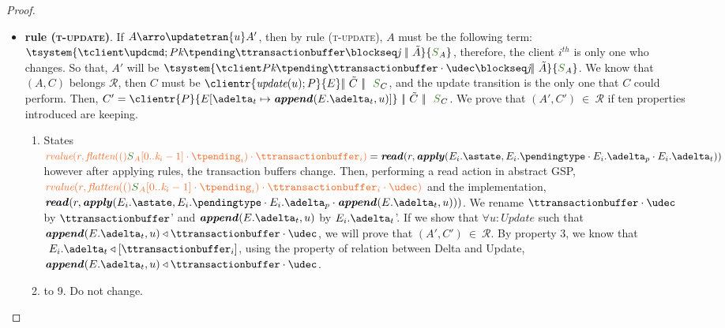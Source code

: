 \documentclass[envcountsect,runningheads,orivec]{llncs}
\begin{document}
\begin{proof}
\begin{itemize}
\begin{itemize}
			\item {\bf rule (\textsc{t-update})}. If $A \arroi{\updatetran{u}} A'$, then by rule (\textsc{\footnotesize{t-update}}), $A$ must be the following term: $ \tsystem{\tclienti{\tupdateins}{\tknown}{\tpending}{\ttransactionbuffer}{\tsent}{\treceivebuffer}\ \bigpar\ \tilde{A}}{\queuemessage_A}$, therefore, the client $i^{th}$ is only one who changes. So that, $A'$ will be $\tsystem{\tclienti{\tprogram}{\tknown}{\tpending}{\ttransactionbuffer \cdot \tupdate}{\tsent}{\treceivebuffer}\bigpar\ \tilde{A}}{\queuemessage_A}$. We know that $(A,C)$ belongs $\mathcal{R}$, then $C$ must be $\clientr{\updateins{u}}{\stateclient} \bigpar\ \tilde{C} \ \bigpar\ \ \queuemessage_C$, and the update transition is the only one that $C$ could perform. Then, $C' = \clientr{P}{\update{E}{\transactionbuffer}{\appendplus{E.\transactionbuffer}{u}}}\ \bigpar\ \tilde{C} \ \bigpar\ \ \queuemessage_C$. We prove that $(A',C') \ \in \ \mathcal{R}$ if ten properties introduced are keeping.					
						\begin{enumerate}
							\item States $\rvalue{r}{\flatten(\queuemessage_{A}[0..\tknown_i-1] \cdot \tpending_i) \cdot \ttransactionbuffer_i} = \readp{r}{\applyplus{E_{i}.\known}{E_{i}.\pending \cdot E_{i}.\pushbuffer \cdot E_{i}.\transactionbuffer}}$ however after applying rules, the transaction buffers change. Then, performing a read action in abstract GSP, $\rvalue{r}{\flatten(\queuemessage_{A}[0..\tknown_i-1] \cdot \tpending_i) \cdot \ttransactionbuffer_i \cdot \tupdate}$ and the implementation, $\readp{r}{\applyplus{E_{i}.\known}{E_{i}.\pending \cdot E_{i}.\pushbuffer \cdot \appendplus{E.\transactionbuffer}{u}}}$. We rename $\ttransactionbuffer \cdot \tupdate$ by $\ttransactionbuffer$' and  $\appendplus{E.\transactionbuffer}{u}$ by $E_{i}.\transactionbuffer$'. If we show that $\forall u: Update$ such that $\appendplus{E.\transactionbuffer}{u} \triangleleft \ttransactionbuffer \cdot \tupdate$, we will prove that $(A',C') \ \in \ \mathcal{R}$. By property 3, we know that $\ E_{i}.\transactionbuffer \triangleleft [\ttransactionbuffer_i]$, using the property of relation between Delta and Update, $\appendplus{E.\transactionbuffer}{u} \triangleleft \ttransactionbuffer \cdot \tupdate$.
							\item to 9. Do not change.
						
						\end{enumerate}
	

\end{itemize}
\end{itemize}
\end{proof}
\end{document}
